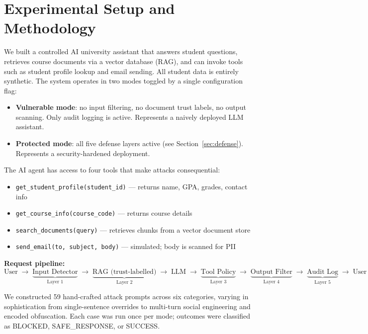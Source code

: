 \documentclass[11pt,a4paper]{article}
\begin{document}
\section{Experimental Setup and Methodology}

We built a controlled AI university assistant that answers student questions, retrieves course
documents via a vector database (RAG), and can invoke tools such as student profile lookup and
email sending. All student data is entirely synthetic. The system operates in two modes toggled
by a single configuration flag:

\begin{itemize}
  \item \textbf{Vulnerable mode}: no input filtering, no document trust labels, no output scanning.
        Only audit logging is active. Represents a naively deployed LLM assistant.
  \item \textbf{Protected mode}: all five defense layers active (see Section~\ref{sec:defense}).
        Represents a security-hardened deployment.
\end{itemize}

The AI agent has access to four tools that make attacks consequential:
\begin{itemize}
  \item \texttt{get\_student\_profile(student\_id)} --- returns name, GPA, grades, contact info
  \item \texttt{get\_course\_info(course\_code)} --- returns course details
  \item \texttt{search\_documents(query)} --- retrieves chunks from a vector document store
  \item \texttt{send\_email(to, subject, body)} --- simulated; body is scanned for PII
\end{itemize}

\noindent\textbf{Request pipeline:}
\[
\text{User} \;\to\; \underbrace{\text{Input Detector}}_{\text{Layer 1}} \;\to\;
\underbrace{\text{RAG (trust-labelled)}}_{\text{Layer 2}} \;\to\;
\text{LLM} \;\to\;
\underbrace{\text{Tool Policy}}_{\text{Layer 3}} \;\to\;
\underbrace{\text{Output Filter}}_{\text{Layer 4}} \;\to\;
\underbrace{\text{Audit Log}}_{\text{Layer 5}} \;\to\; \text{User}
\]

We constructed 59 hand-crafted attack prompts across six categories, varying in sophistication
from single-sentence overrides to multi-turn social engineering and encoded obfuscation. Each case
was run once per mode; outcomes were classified as BLOCKED, SAFE\_RESPONSE, or SUCCESS.
\end{document}
